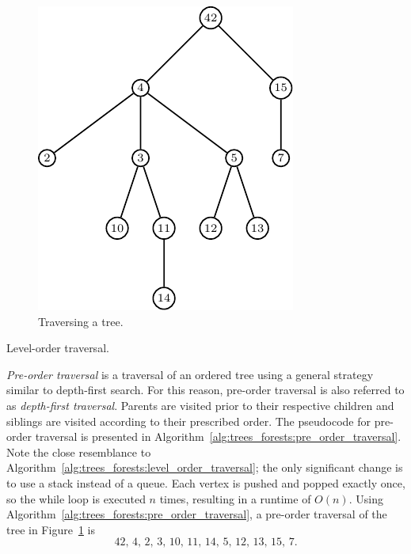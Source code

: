 \begin{figure}[!htbp]
\centering
{}
\includegraphics{image/trees-forests/tree-traversal}
\caption{Traversing a tree.}
\label{fig:trees_forests:tree_traversal}
\end{figure}

\begin{algorithm}[!htbp]

\caption{Level-order traversal.}
\label{alg:trees_forests:level_order_traversal}
\end{algorithm}

\emph{Pre-order traversal} is a traversal
of an ordered tree using a general strategy similar to
depth-first search. For this reason,
pre-order traversal is also referred to as
\emph{depth-first traversal}. Parents are visited prior to their
respective children and siblings are visited according to their
prescribed order. The pseudocode for
pre-order traversal is presented in
Algorithm~\ref{alg:trees_forests:pre_order_traversal}. Note the
close resemblance to
Algorithm~\ref{alg:trees_forests:level_order_traversal}; the only
significant change is to use a stack instead of a
queue. Each vertex is pushed and
popped exactly once, so the while loop is executed
$n$ times, resulting in a runtime of $O(n)$. Using
Algorithm~\ref{alg:trees_forests:pre_order_traversal}, a
pre-order traversal of the tree in
Figure~\ref{fig:trees_forests:tree_traversal} is
\[
42,\, 4,\, 2,\, 3,\, 10,\, 11,\, 14,\, 5,\, 12,\, 13,\, 15,\, 7.
\]

